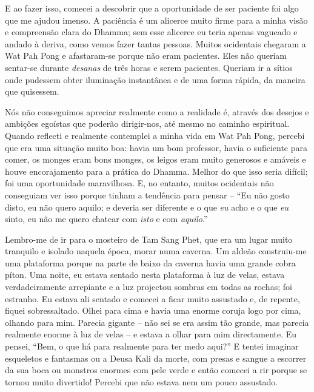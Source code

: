 E ao fazer isso, comecei a descobrir que a oportunidade de ser paciente foi algo
que me ajudou imenso. A paciência é um alicerce muito firme para a minha visão e
compreensão clara do Dhamma; sem esse alicerce eu teria apenas vagueado e andado
à deriva, como vemos fazer tantas pessoas. Muitos ocidentais chegaram a Wat Pah
Pong e afastaram-se porque não eram pacientes. Eles não queriam sentar-se
durante \emph{desanas} de três horas e serem pacientes. Queriam ir a sítios onde
pudessem obter iluminação instantânea e de uma forma rápida, da maneira que
quisessem.

Nós não conseguimos apreciar realmente como a realidade é, através dos desejos e
ambições egoístas que poderão dirigir-nos, até mesmo no caminho espiritual.
Quando reflecti e realmente contemplei a minha vida em Wat Pah Pong, percebi que
era uma situação muito boa: havia um bom professor, havia o suficiente para
comer, os monges eram bons monges, os leigos eram muito generosos e amáveis e
houve encorajamento para a prática do Dhamma. Melhor do que isso seria difícil;
foi uma oportunidade maravilhosa. E, no entanto, muitos ocidentais não
conseguiam ver isso porque tinham a tendência para pensar -- ``Eu não gosto
disto, eu não quero aquilo; e deveria ser diferente e o que \emph{eu} acho e o
que \emph{eu} sinto, eu não me quero chatear com \emph{isto} e com
\emph{aquilo}.''

Lembro-me de ir para o mosteiro de Tam Sang Phet, que era um lugar muito
tranquilo e isolado naquela época, morar numa caverna. Um aldeão construiu-me
uma plataforma porque na parte de baixo da caverna havia uma grande cobra píton.
Uma noite, eu estava sentado nesta plataforma à luz de velas, estava
verdadeiramente arrepiante e a luz projectou sombras em todas as rochas; foi
estranho. Eu estava ali sentado e comecei a ficar muito assustado e, de repente,
fiquei sobressaltado. Olhei para cima e havia uma enorme coruja logo por cima,
olhando para mim. Parecia gigante -- não sei se era assim tão grande, mas
parecia realmente enorme à luz de velas -- e estava a olhar para mim
directamente. Eu pensei, ``Bem, o que há para realmente para ter medo aqui?'' E
tentei imaginar esqueletos e fantasmas ou a Deusa Kali da morte, com presas e
sangue a escorrer da sua boca ou monstros enormes com pele verde e então comecei
a rir porque se tornou muito divertido! Percebi que não estava nem um pouco
assustado.

